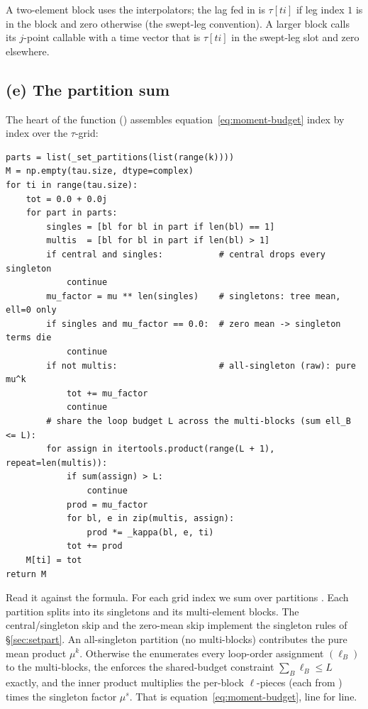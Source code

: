 A two-element block uses the interpolators; the lag fed in is $\tau[ti]$ if leg
index $1$ is in the block and zero otherwise (the swept-leg convention). A larger
block calls its $j$-point callable with a time vector that is $\tau[ti]$ in the
swept-leg slot and zero elsewhere.

\subsection*{(e) The partition sum}

The heart of the function () assembles
equation~\eqref{eq:moment-budget} index by index over the $\tau$-grid:

\begin{lstlisting}
parts = list(_set_partitions(list(range(k))))
M = np.empty(tau.size, dtype=complex)
for ti in range(tau.size):
    tot = 0.0 + 0.0j
    for part in parts:
        singles = [bl for bl in part if len(bl) == 1]
        multis  = [bl for bl in part if len(bl) > 1]
        if central and singles:           # central drops every singleton
            continue
        mu_factor = mu ** len(singles)    # singletons: tree mean, ell=0 only
        if singles and mu_factor == 0.0:  # zero mean -> singleton terms die
            continue
        if not multis:                    # all-singleton (raw): pure mu^k
            tot += mu_factor
            continue
        # share the loop budget L across the multi-blocks (sum ell_B <= L):
        for assign in itertools.product(range(L + 1), repeat=len(multis)):
            if sum(assign) > L:
                continue
            prod = mu_factor
            for bl, e in zip(multis, assign):
                prod *= _kappa(bl, e, ti)
            tot += prod
    M[ti] = tot
return M
\end{lstlisting}

Read it against the formula. For each grid index  we sum over partitions
. Each partition splits into its singletons and its multi-element
blocks. The central/singleton skip and the zero-mean skip implement the singleton
rules of \S\ref{sec:setpart}. An all-singleton partition (no multi-blocks)
contributes the pure mean product $\mu^{k}$. Otherwise the
 enumerates every
loop-order assignment $(\ell_B)$ to the multi-blocks, the
 enforces the shared-budget constraint
$\sum_B\ell_B\le L$ exactly, and the inner product multiplies the per-block
$\ell$-pieces (each from ) times the singleton factor $\mu^{s}$.
That is equation~\eqref{eq:moment-budget}, line for line.

